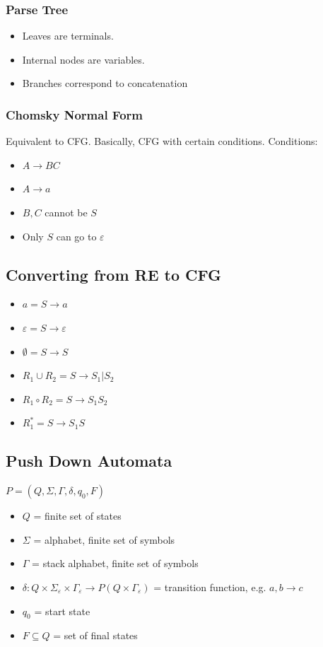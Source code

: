 \documentclass{article}
\begin{document}
\subsubsection{Parse Tree}
\begin{itemize}
    \item Leaves are terminals.
    \item Internal nodes are variables.
    \item Branches correspond to concatenation
\end{itemize}

\subsubsection{Chomsky Normal Form}
Equivalent to CFG. Basically, CFG with certain conditions. Conditions:
\begin{itemize}
    \item $A \to BC$
    \item $A \to a$
    \item $B,C$ cannot be $S$
    \item Only $S$ can go to $\varepsilon$
\end{itemize}

\subsection{Converting from RE to CFG}
\begin{itemize}
    \item $a = S \to a$
    \item $\varepsilon = S \to \varepsilon$
    \item $\emptyset = S \to S$
    \item $R_1 \cup R_2 = S \to S_1 | S_2$
    \item $R_1 \circ R_2 = S \to S_1 S_2$
    \item $R_1^* = S \to S_1 S$
\end{itemize}

\subsection{Push Down Automata}
$P = (Q, \Sigma, \Gamma, \delta, q_0, F)$
\begin{itemize}
    \item $Q$ = finite set of states
    \item $\Sigma$ = alphabet, finite set of symbols
    \item $\Gamma$ = stack alphabet, finite set of symbols
    \item $\delta: Q \times \Sigma_{\varepsilon} \times \Gamma_{\varepsilon} \to P(Q\times \Gamma_{\varepsilon})$ = transition function, e.g. $a, b\to c$
    \item $q_0$ = start state
    \item $F \subseteq Q$ = set of final states
\end{itemize}
\end{document}
